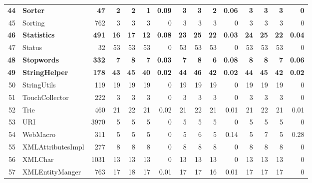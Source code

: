 \documentclass[conference]{IEEEtran}
\begin{document}
\begin{table} [htp!]
{\begin{tabularx}{1 \textwidth}{r l r r r r r r r r r r r r r}
\textbf{44}						& \textbf{Sorter}					&\textbf{47}			& \textbf{2}		&	\textbf{2}	&	\textbf{1}	& 	\textbf{0.09}					& \textbf{3}		& \textbf{3} 		& \textbf{2}		& 		\textbf{0.06}			&\textbf{3}			& \textbf{3}			& \textbf{3}			&	\textbf{0}\\      
45						& Sorting					&762		& 3		&	3	&	3	& 	0					& 3		& 3 		& 3		& 		0			& 3			& 3			& 3			&	0\\      
\textbf{46}						& \textbf{Statistics}				&\textbf{491}		& \textbf{16}		&	\textbf{17}	&	\textbf{12}	&	\textbf{0.08}					& \textbf{23}		& \textbf{25} 		& \textbf{22}		& 		\textbf{0.03}			& \textbf{24}			& \textbf{25}			& \textbf{22}			&	\textbf{0.04}\\      
47						& Status					&32			& 53		&	53	&	53	& 	0					& 53		& 53 		& 53		& 		0			& 53			& 53			& 53			&	0\\      
\textbf{48}						& \textbf{Stopwords}				&\textbf{332}		& \textbf{7}		&	\textbf{8}	&	\textbf{7}	& 	\textbf{0.03}					& \textbf{7}		&  \textbf{8}		& \textbf{6}		& 		\textbf{0.08}			& \textbf{8}			& \textbf{8}			& \textbf{7}			&	\textbf{0.06}\\      
\textbf{49}						& \textbf{StringHelper}				&\textbf{178}		& \textbf{43}	 	& 	\textbf{45}	&	\textbf{40}	& 	\textbf{0.02}					& \textbf{44}		&  \textbf{46}		& \textbf{42}		& 		\textbf{0.02}			& \textbf{44}			& \textbf{45}			& \textbf{42}			&	\textbf{0.02}\\      
50						& StringUtils				&119		& 19 		&	19	&	19	& 	0					& 19		& 19 		& 19		& 		0			& 19			& 19			& 19			&	0\\      
51						& TouchCollector			&222		& 3		&	3	&	3	& 	0					& 3		&  3		& 3		& 		0			& 3			& 3			& 3			&	0\\      
52						& Trie					&460		& 21		&	22	&	21	& 	0.02					& 21		&  22		& 21		& 		0.01			& 21			& 22			& 21			&	0.01\\      
53						& URI					&3970		& 5 		&	5	&	5	& 	0					& 5		&  5		& 5		& 		0			& 5			& 5			& 5			&	0\\      
54						& WebMacro				&311		& 5		&	5	&	5	& 	0					& 5		&  6		& 5		& 		0.14			& 5			& 7			& 5			&	0.28\\      
55						& XMLAttributesImpl			&277		& 8		&	8	&	8	& 	0					& 8		&  8		& 8		& 		0			& 8			& 8			& 8			&	0\\      
56						& XMLChar				&1031		& 13		&	13	&	13	& 	0					& 13		&  13		& 13		& 		0			& 13			& 13			& 13			&	0\\      
57						& XMLEntityManger			&763		& 17		&	18	&	17	& 	0.01					& 17		&  17		& 16		& 		0.01			& 17			& 17			& 17			&	0\\      

\end{tabularx}}
\end{table}
\end{document}
